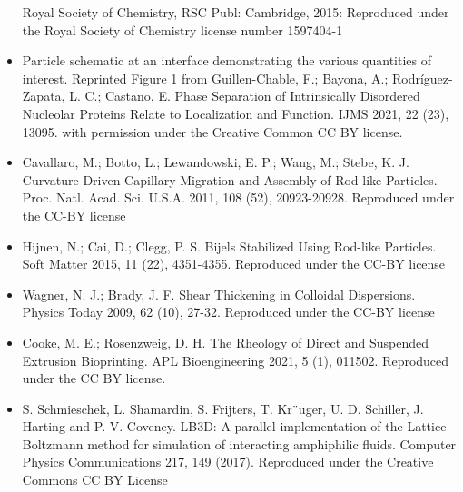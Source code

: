 \begin{itemize}
    Royal Society of Chemistry, RSC Publ: Cambridge, 2015: Reproduced under the Royal Society of Chemistry license number 1597404-1
    \item Particle schematic at an interface demonstrating the various quantities of interest. Reprinted Figure 1 from
    Guillen-Chable, F.; Bayona, A.; Rodríguez-Zapata, L. C.; Castano, E. Phase Separation of Intrinsically Disordered 
    Nucleolar Proteins Relate to Localization and Function. IJMS 2021, 22 (23), 13095. with permission under the Creative Common CC BY license.
    \item Cavallaro, M.; Botto, L.; Lewandowski, E. P.; Wang, M.; Stebe, K. J. Curvature-Driven Capillary Migration and Assembly of Rod-like Particles. 
    Proc. Natl. Acad. Sci. U.S.A. 2011, 108 (52), 20923-20928. Reproduced under the CC-BY license
    \item Hijnen, N.; Cai, D.; Clegg, P. S. Bijels Stabilized Using Rod-like Particles. Soft Matter 2015, 11 (22), 4351-4355. Reproduced under the CC-BY license
    \item Wagner, N. J.; Brady, J. F. Shear Thickening in Colloidal Dispersions. Physics Today 2009, 62 (10), 27-32. Reproduced under the CC-BY license
    \item Cooke, M. E.; Rosenzweig, D. H. The Rheology of Direct and Suspended Extrusion Bioprinting. APL Bioengineering 2021, 5 (1), 
          011502. Reproduced under the CC BY license.
    \item S. Schmieschek, L. Shamardin, S. Frijters, T. Kr¨uger, U. D. Schiller, J. Harting and P. V.
    Coveney. LB3D: A parallel implementation of the Lattice-Boltzmann method for simulation
    of interacting amphiphilic fluids. Computer Physics Communications 217, 149 (2017). Reproduced under the Creative Commons CC BY License
\end{itemize}

